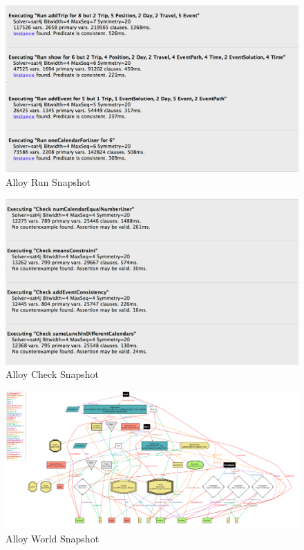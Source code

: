 

\newpage
{}
\begin{figure}[H]
	\centering
	\includegraphics[scale=0.37]{Images/Alloy/Run}
	\caption{Alloy Run Snapshot}
\end{figure}
\begin{figure}[H]
\centering
\includegraphics[scale=0.5]{Images/Alloy/Check}
\caption{Alloy Check Snapshot}
\end{figure}

\newpage
{}
\begin{figure}[H]
	\centering
	\includegraphics[scale=0.35]{Images/Alloy/Show}
	\caption{Alloy World Snapshot}
\end{figure}

